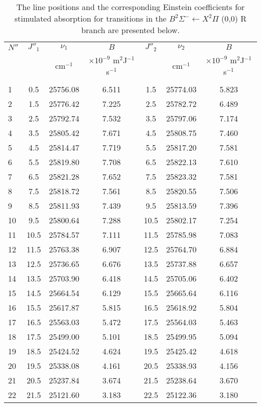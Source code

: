 \begin{table}
  \caption[Absorption lines and coefficients for the \(B^2\Sigma^-\leftarrow X^2\Pi\) (0,0) R branch]{The line positions and the corresponding Einstein coefficients for stimulated absorption for transitions in the \(B^2\Sigma^-\leftarrow X^2\Pi\) (0,0) R branch are presented below.}
  \begin{center}
    \begin{tabular}{lcccccc}
      \(N''\) & \(J''_1\) & \(\nu_1\) & \(B\) & \(J''_2\) & \(\nu_2\) & \(B\) \tabularnewline
        & & cm\(^{-1}\) & \(\times10^{-9}\) m\(^2\)J\(^{-1}\)s\(^{-1}\) & & cm\(^{-1}\) & \(\times10^{-9}\) m\(^2\)J\(^{-1}\)s\(^{-1}\) \tabularnewline
      \hline\hline
      & & & & & & \tabularnewline
      1  & 0.5  & 25756.08 & 6.511 & 1.5  & 25774.03 & 5.823 \tabularnewline
      2  & 1.5  & 25776.42 & 7.225 & 2.5  & 25782.72 & 6.489 \tabularnewline
      3  & 2.5  & 25792.74 & 7.532 & 3.5  & 25797.06 & 7.174 \tabularnewline
      4  & 3.5  & 25805.42 & 7.671 & 4.5  & 25808.75 & 7.460 \tabularnewline
      5  & 4.5  & 25814.47 & 7.719 & 5.5  & 25817.20 & 7.581 \tabularnewline
      6  & 5.5  & 25819.80 & 7.708 & 6.5  & 25822.13 & 7.610 \tabularnewline
      7  & 6.5  & 25821.28 & 7.652 & 7.5  & 25823.32 & 7.581 \tabularnewline
      8  & 7.5  & 25818.72 & 7.561 & 8.5  & 25820.55 & 7.506 \tabularnewline
      9  & 8.5  & 25811.93 & 7.439 & 9.5  & 25813.59 & 7.396 \tabularnewline
      10 & 9.5  & 25800.64 & 7.288 & 10.5 & 25802.17 & 7.254 \tabularnewline
      11 & 10.5 & 25784.57 & 7.111 & 11.5 & 25785.98 & 7.083 \tabularnewline
      12 & 11.5 & 25763.38 & 6.907 & 12.5 & 25764.70 & 6.884 \tabularnewline
      13 & 12.5 & 25736.65 & 6.676 & 13.5 & 25737.88 & 6.657 \tabularnewline
      14 & 13.5 & 25703.90 & 6.418 & 14.5 & 25705.06 & 6.402 \tabularnewline
      15 & 14.5 & 25664.54 & 6.129 & 15.5 & 25665.64 & 6.116 \tabularnewline
      16 & 15.5 & 25617.87 & 5.815 & 16.5 & 25618.92 & 5.804 \tabularnewline
      17 & 16.5 & 25563.03 & 5.472 & 17.5 & 25564.03 & 5.463 \tabularnewline
      18 & 17.5 & 25499.00 & 5.101 & 18.5 & 25499.95 & 5.094 \tabularnewline
      19 & 18.5 & 25424.52 & 4.624 & 19.5 & 25425.42 & 4.618 \tabularnewline
      20 & 19.5 & 25338.08 & 4.161 & 20.5 & 25338.93 & 4.156 \tabularnewline
      21 & 20.5 & 25237.84 & 3.674 & 21.5 & 25238.64 & 3.670 \tabularnewline
      22 & 21.5 & 25121.60 & 3.183 & 22.5 & 25122.36 & 3.180 \tabularnewline
      \hline
    \end{tabular}
  \end{center}
  \label{tab:absorptionLines}
\end{table}

